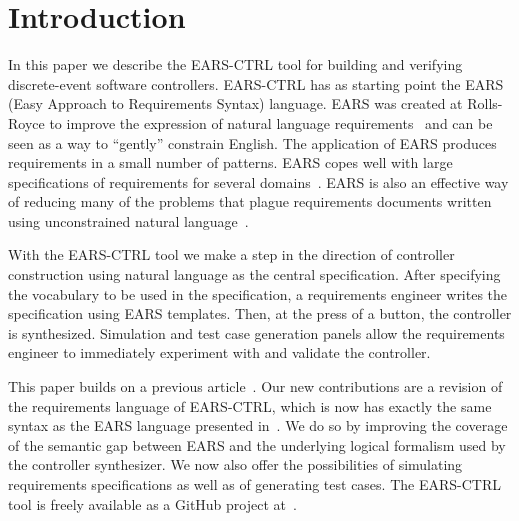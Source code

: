\section{Introduction}
\vspace{-.3cm}In this paper we describe the \textsf{EARS-CTRL} tool for
building and verifying discrete-event software controllers. \textsf{EARS-CTRL} has as starting point
the EARS (Easy Approach to Requirements Syntax) language. EARS was created at Rolls-Royce to
improve the expression of natural language requirements~\cite{EARS09} and can be
seen as a way to ``gently'' constrain English. The application of EARS produces
requirements in a small number of patterns. EARS copes well with large
specifications of requirements for several domains~\cite{EARS10,EARS16}. EARS is
also an effective way of reducing many of the problems that plague requirements
documents written using unconstrained natural language~\cite{EARS09}.

With the \textsf{EARS-CTRL} tool we make a step in the direction of controller
construction using natural language as the central specification.
After specifying the vocabulary to be used in the specification, a requirements
engineer writes the specification using EARS templates. Then, at the press of a
button, the controller is synthesized. Simulation and test case
generation panels allow the requirements engineer to immediately
experiment with and validate the controller.

This paper builds on a previous article~\cite{LucioRCM17}.
Our new contributions are a revision of the requirements language of
\textsf{EARS-CTRL}, which is now has exactly the same syntax as the EARS
language presented in~\cite{EARS09}. We do so by improving the coverage of the
semantic gap between EARS and the underlying logical formalism used by the controller synthesizer. We now also offer the
possibilities of simulating requirements specifications as well as of generating test cases.
The \textsf{EARS-CTRL} tool is freely available as a GitHub project 
at~\cite{EARSProject}. \vspace{-.4cm}


